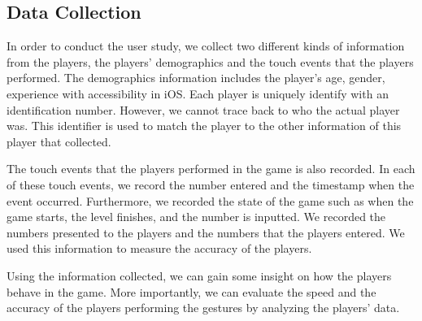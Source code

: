 \subsection{Data Collection}
In order to conduct the user study, we collect two different kinds of information from the players, the players' demographics and the touch events that the players performed. The demographics information includes the player's age, gender, experience with accessibility in iOS. Each player is uniquely identify with an identification number. However, we cannot trace back to who the actual player was. This identifier is used to match the player to the other information of this player that collected.
\par
The touch events that the players performed in the game is also recorded. In each of these touch events, we record the number entered and the timestamp when the event occurred. Furthermore, we recorded the state of the game such as when the game starts, the level finishes, and the number is inputted. We recorded the numbers presented to the players and the numbers that the players entered. We used this information to measure the accuracy of the players.
\par
Using the information collected, we can gain some insight on how the players behave in the game. More importantly, we can evaluate the speed and the accuracy of the players performing the gestures by analyzing the players' data.
